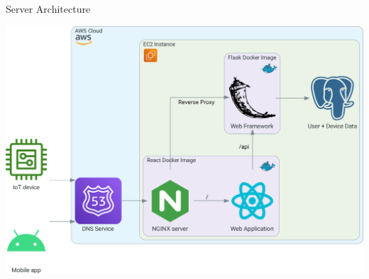 \documentclass[final]{beamer}
\newlength{\colwidth}
\begin{document}
\begin{frame}[t]
\begin{columns}[t]
\begin{column}{\colwidth}
      \begin{block}{Server Architecture}
        \vskip 0.5cm
        \begin{center}
          \includegraphics[width = \linewidth]{data_flow.png}
        \end{center}
      \end{block}


\end{column}
\end{columns}
\end{frame}
\end{document}
